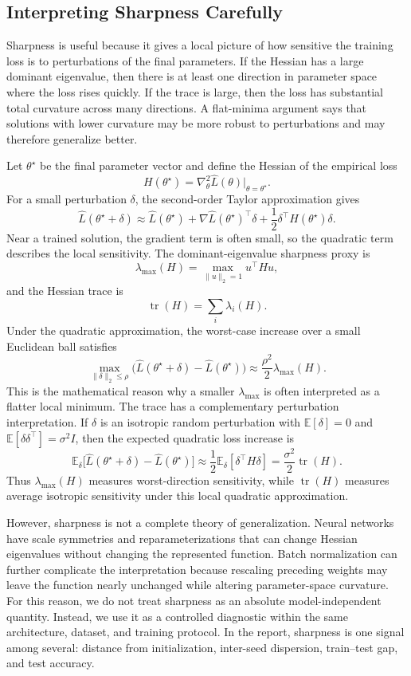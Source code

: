 \documentclass[11pt]{article}
\begin{document}
\subsection{Interpreting Sharpness Carefully}

Sharpness is useful because it gives a local picture of how sensitive the training loss is to perturbations of the final parameters. If the Hessian has a large dominant eigenvalue, then there is at least one direction in parameter space where the loss rises quickly. If the trace is large, then the loss has substantial total curvature across many directions. A flat-minima argument says that solutions with lower curvature may be more robust to perturbations and may therefore generalize better.

Let $\theta^\star$ be the final parameter vector and define the Hessian of the empirical loss
\[
H(\theta^\star)
= \nabla^2_\theta \widehat L(\theta)\big|_{\theta=\theta^\star}.
\]
For a small perturbation $\delta$, the second-order Taylor approximation gives
\[
\widehat L(\theta^\star+\delta)
\approx
\widehat L(\theta^\star)
+ \nabla \widehat L(\theta^\star)^\top \delta
+ \frac{1}{2}\delta^\top H(\theta^\star)\delta.
\]
Near a trained solution, the gradient term is often small, so the quadratic term describes the local sensitivity. The dominant-eigenvalue sharpness proxy is
\[
\lambda_{\max}(H)
= \max_{\|u\|_2=1} u^\top H u,
\]
and the Hessian trace is
\[
\operatorname{tr}(H)
= \sum_i \lambda_i(H).
\]
Under the quadratic approximation, the worst-case increase over a small Euclidean ball satisfies
\[
\max_{\|\delta\|_2\le \rho}
\big(\widehat L(\theta^\star+\delta)-\widehat L(\theta^\star)\big)
\approx
\frac{\rho^2}{2}\lambda_{\max}(H).
\]
This is the mathematical reason why a smaller $\lambda_{\max}$ is often interpreted as a flatter local minimum. The trace has a complementary perturbation interpretation. If $\delta$ is an isotropic random perturbation with $\mathbb{E}[\delta]=0$ and $\mathbb{E}[\delta\delta^\top]=\sigma^2 I$, then the expected quadratic loss increase is
\[
\mathbb{E}_{\delta}
\big[\widehat L(\theta^\star+\delta)-\widehat L(\theta^\star)\big]
\approx
\frac{1}{2}\mathbb{E}_{\delta}[\delta^\top H\delta]
=
\frac{\sigma^2}{2}\operatorname{tr}(H).
\]
Thus $\lambda_{\max}(H)$ measures worst-direction sensitivity, while $\operatorname{tr}(H)$ measures average isotropic sensitivity under this local quadratic approximation.

However, sharpness is not a complete theory of generalization. Neural networks have scale symmetries and reparameterizations that can change Hessian eigenvalues without changing the represented function. Batch normalization can further complicate the interpretation because rescaling preceding weights may leave the function nearly unchanged while altering parameter-space curvature. For this reason, we do not treat sharpness as an absolute model-independent quantity. Instead, we use it as a controlled diagnostic within the same architecture, dataset, and training protocol. In the report, sharpness is one signal among several: distance from initialization, inter-seed dispersion, train--test gap, and test accuracy.
\end{document}
